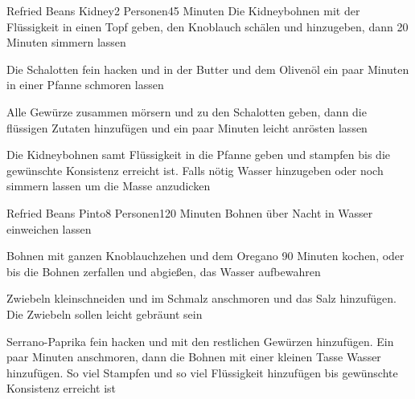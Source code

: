 \begin{recipe}{Refried Beans Kidney}{2 Personen}{45 Minuten}
Die Kidneybohnen mit der Flüssigkeit in einen Topf geben, den Knoblauch schälen und hinzugeben, dann 20 Minuten simmern lassen

Die Schalotten fein hacken und in der Butter und dem Olivenöl ein paar Minuten in einer Pfanne schmoren lassen

Alle Gewürze zusammen mörsern und zu den Schalotten geben, dann die flüssigen Zutaten hinzufügen und ein paar Minuten leicht anrösten lassen

\ing[]{}{}
Die Kidneybohnen samt Flüssigkeit in die Pfanne geben und stampfen bis die gewünschte Konsistenz erreicht ist. Falls nötig Wasser hinzugeben oder noch simmern lassen um die Masse anzudicken
\end{recipe}


\begin{recipe}{Refried Beans Pinto}{8 Personen}{120 Minuten}
Bohnen über Nacht in Wasser einweichen lassen

Bohnen mit ganzen Knoblauchzehen und dem Oregano 90 Minuten kochen, oder bis die Bohnen zerfallen und abgießen, das Wasser aufbewahren

Zwiebeln kleinschneiden und im Schmalz anschmoren und das Salz hinzufügen. Die Zwiebeln sollen leicht gebräunt sein

Serrano-Paprika fein hacken und mit den restlichen Gewürzen hinzufügen.
Ein paar Minuten anschmoren, dann die Bohnen mit einer kleinen Tasse Wasser hinzufügen.
So viel Stampfen und so viel Flüssigkeit hinzufügen bis gewünschte Konsistenz erreicht ist
\end{recipe}

